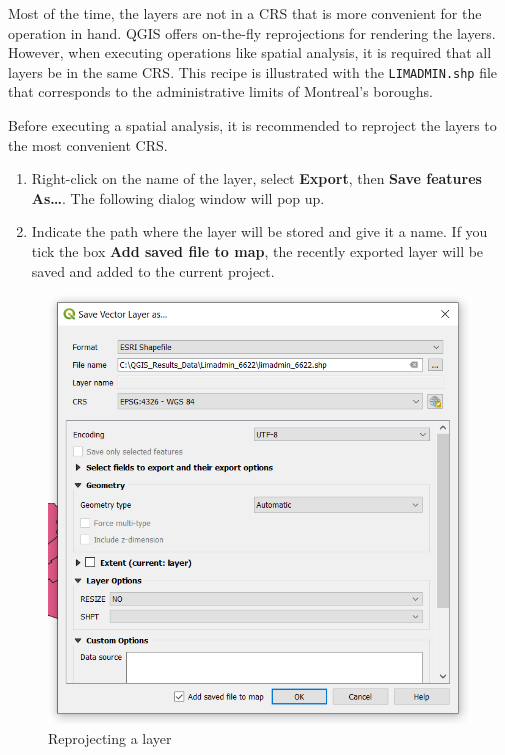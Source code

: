 \documentclass[]{book}
\providecommand{\tightlist}{%
  \setlength{\itemsep}{0pt}\setlength{\parskip}{0pt}}
\theoremstyle{definition}
\theoremstyle{definition}
\theoremstyle{definition}
\theoremstyle{remark}
\begin{document}
Most of the time, the layers are not in a CRS that is more convenient
for the operation in hand. QGIS offers on-the-fly reprojections for
rendering the layers. However, when executing operations like spatial
analysis, it is required that all layers be in the same CRS. This recipe
is illustrated with the \texttt{LIMADMIN.shp} file that corresponds to
the administrative limits of Montreal's boroughs.

Before executing a spatial analysis, it is recommended to reproject the
layers to the most convenient CRS.

\begin{enumerate}
\def\labelenumi{\arabic{enumi}.}
\tightlist
\item
  Right-click on the name of the layer, select \textbf{Export}, then
  \textbf{Save features As\ldots{}}. The following dialog window will
  pop up.
\item
  Indicate the path where the layer will be stored and give it a name.
  If you tick the box \textbf{Add saved file to map}, the recently
  exported layer will be saved and added to the current project.
\end{enumerate}

\begin{figure}

{\centering \includegraphics[width=9.64in]{figures/Reproject_Layer} 

}

\caption{Reprojecting a layer}\label{fig:unnamed-chunk-10}
\end{figure}
\end{document}
